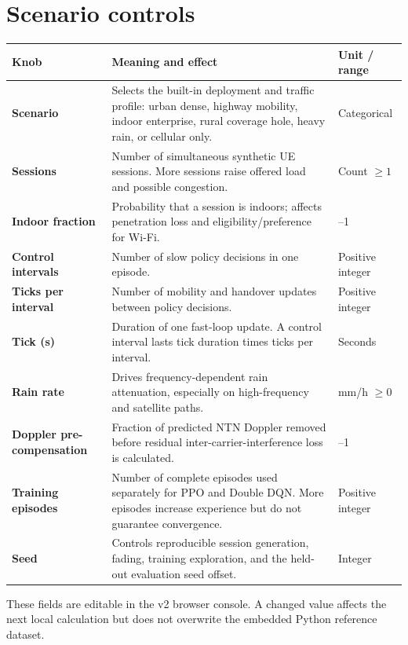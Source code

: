 \documentclass[10pt]{article}
\newcommand{\ui}[1]{\textsf{\textbf{#1}}}
\begin{document}
\section{Scenario controls}
\begin{tabular}{>{\raggedright\arraybackslash}p{}>{\raggedright\arraybackslash}p{}>{\raggedright\arraybackslash}p{}}
\toprule
Knob & Meaning and effect & Unit / range\\
\midrule
\ui{Scenario} & Selects the built-in deployment and traffic profile: urban dense, highway mobility, indoor enterprise, rural coverage hole, heavy rain, or cellular only. & Categorical\\
\ui{Sessions} & Number of simultaneous synthetic UE sessions. More sessions raise offered load and possible congestion. & Count $\geq 1$\\
\ui{Indoor fraction} & Probability that a session is indoors; affects penetration loss and eligibility/preference for Wi-Fi. & 0--1\\
\ui{Control intervals} & Number of slow policy decisions in one episode. & Positive integer\\
\ui{Ticks per interval} & Number of mobility and handover updates between policy decisions. & Positive integer\\
\ui{Tick (s)} & Duration of one fast-loop update. A control interval lasts tick duration times ticks per interval. & Seconds\\
\ui{Rain rate} & Drives frequency-dependent rain attenuation, especially on high-frequency and satellite paths. & mm/h $\geq0$\\
\ui{Doppler pre-compensation} & Fraction of predicted NTN Doppler removed before residual inter-carrier-interference loss is calculated. & 0--1\\
\ui{Training episodes} & Number of complete episodes used separately for PPO and Double DQN. More episodes increase experience but do not guarantee convergence. & Positive integer\\
\ui{Seed} & Controls reproducible session generation, fading, training exploration, and the held-out evaluation seed offset. & Integer\\
\bottomrule
\end{tabular}

These fields are editable in the v2 browser console. A changed value affects the next local calculation but does not overwrite the embedded Python reference dataset.
\end{document}
